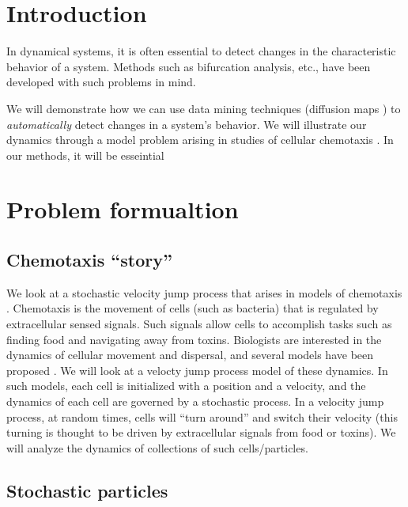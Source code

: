 \documentclass[prl,reprint]{revtex4-1}
\begin{document}
\maketitle

\section{Introduction} 
 
In dynamical systems, it is often essential to detect changes in the characteristic behavior of a system.
%
Methods such as bifurcation analysis, etc., have been developed with such problems in mind. 

We will demonstrate how we can use data mining techniques (diffusion maps \cite{coifman2005geometric}) to {\em automatically} detect changes in a system's behavior.
%
We will illustrate our dynamics through a model problem arising in studies of cellular chemotaxis \cite{othmer2000diffusion}.
%
In our methods, it will be esseintial 


\section{Problem formualtion}

\subsection{Chemotaxis ``story''} 

We look at a stochastic velocity jump process that arises in models of chemotaxis \cite{othmer2000diffusion}.
%
Chemotaxis is the movement of cells (such as bacteria) that is regulated by extracellular sensed signals.
%
Such signals allow cells to accomplish tasks such as finding food and navigating away from toxins.
%
Biologists are interested in the dynamics of cellular movement and dispersal, and several models have been proposed \cite{othmer1988models, codling2008random}.
%
We will look at a velocty jump process model of these dynamics.
%
In such models, each cell is initialized with a position and a velocity, and the dynamics of each cell are governed by a stochastic process.
%
In a velocity jump process, at random times, cells will ``turn around'' and switch their velocity (this turning is thought to be driven by extracellular signals from food or toxins). 
%
We will analyze the dynamics of collections of such cells/particles. 

\subsection{Stochastic particles}
\end{document}
